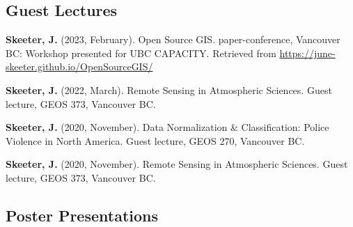 \documentclass[
]{article}
\newlength{\cslhangindent}
\newlength{\cslentryspacingunit} %
\newenvironment{CSLReferences}[2] %
 {%
  \setlength{\parindent}{0pt}
  \ifodd #1
  \let\oldpar\par
  \def\par{\hangindent=\cslhangindent\oldpar}
  \fi
  \setlength{\parskip}{#2\cslentryspacingunit}
 }%
 {}
\begin{document}
\hypertarget{guest-lectures}{%
\subsection{Guest Lectures}\label{guest-lectures}}

\hypertarget{refs-4.2}{}
\begin{CSLReferences}{1}{0}
\leavevmode{}%
\textbf{Skeeter, J.} (2023, February). Open Source GIS.
paper-conference, Vancouver BC: Workshop presented for UBC CAPACITY.
Retrieved from \url{https://june-skeeter.github.io/OpenSourceGIS/}

\leavevmode{}%
\textbf{Skeeter, J.} (2022, March). Remote Sensing in Atmospheric
Sciences. Guest lecture, GEOS 373, Vancouver BC.

\leavevmode{}%
\textbf{Skeeter, J.} (2020, November). Data Normalization \&
Classification: Police Violence in North America. Guest lecture, GEOS
270, Vancouver BC.

\leavevmode{}%
\textbf{Skeeter, J.} (2020, November). Remote Sensing in Atmospheric
Sciences. Guest lecture, GEOS 373, Vancouver BC.

\end{CSLReferences}

\hypertarget{poster-presentations}{%
\subsection{Poster Presentations}\label{poster-presentations}}
\end{document}
